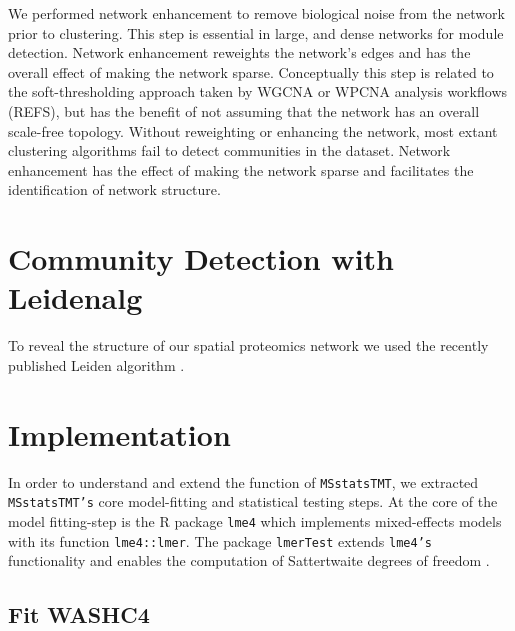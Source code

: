 \documentclass[11pt]{elife}\usepackage[]{graphicx}\usepackage[]{color}
\begin{document}
We performed network enhancement to remove biological noise from the network
prior to clustering. This step is essential in large, and dense networks for
module detection. Network enhancement reweights the
network's edges and has the overall effect of making the network sparse.
Conceptually this step is related to the soft-thresholding approach taken by
WGCNA or WPCNA analysis workflows (REFS), but has the benefit of not assuming
that the network has an overall scale-free topology.  Without reweighting or
enhancing the network, most extant clustering algorithms fail to detect
communities in the dataset.  Network enhancement has the effect of making the
network sparse and facilitates the identification of network structure.\\


\section{Community Detection with Leidenalg}

To reveal the structure of our spatial proteomics network we used the recently
published Leiden algorithm \citep{Traag2019}.

\section{Implementation}

In order to understand and extend the function of \texttt{MSstatsTMT}, we
extracted \texttt{MSstatsTMT's} core model-fitting and statistical testing
steps.  At the core of the model fitting-step is the R package \texttt{lme4}
which implements mixed-effects models with its function
\texttt{lme4::lmer}\citep{Bates2015}. The package \texttt{lmerTest} extends
\texttt{lme4's} functionality and enables the computation of Sattertwaite
degrees of freedom \citep{Kuznetsova2017}. 

\subsection{Fit WASHC4}
\end{document}
